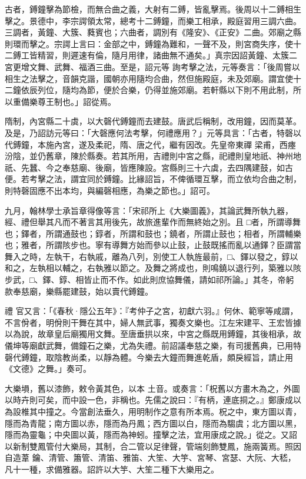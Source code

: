 \begin{pinyinscope}
 古者，鎛鐘擊為節檢，而無合曲之義，大射有二鎛，皆亂擊焉。後周以十二鎛相生擊之。景德中，李宗諤領太常，總考十二鎛鐘，而樂工相承，殿庭習用三調六曲。三調者，黃鐘、大簇、蕤賓也；六曲者，調別有《隆安》、《正安》二曲。郊廟之縣則環而擊之。宗諤上言曰：金部之中，鎛鐘為難和，一聲不及，則宮商失序，使十二鎛工皆精習，則遲速有倫，隨月用律，諸曲無不通矣。」真宗因詔黃鐘、太簇二宮更增文舞、武舞、福酒三曲。至是，詔元等
 詢考擊之法，元等奏言：「後周嘗以相生之法擊之，音韻克諧，國朝亦用隨均合曲，然但施殿庭，未及郊廟。謂宜使十二鐘依辰列位，隨均為節，便於合樂，仍得並施郊廟。若軒縣以下則不用此制，所以重備樂尊王制也。」詔從焉。



 隋制，內宮縣二十虡，以大磬代鎛鐘而去建鼓。唐武后稱制，改用鐘，因而莫革。及是，乃詔訪元等曰：「大磬應何法考擊，何禮應用？」元等具言：「古者，特磬以代鎛鐘，本施內宮，遂及柔祀，隋、唐之代，繼有因改。先皇帝東禪
 梁甫，西瘞汾陰，並仍舊章，陳於縣奏。若其所用，吉禮則中宮之縣，祀禮則皇地祇、神州地祇、先蠶、今之奉慈廟、後廟，皆應陳設。宮縣則三十六虡，去四隅建鼓，如古便。若考擊之法，謂宜同於鎛鐘。比緣詔旨，不俾循環互擊，而立依均合曲之制，則特磬固應不出本均，與編磬相應，為樂之節也。」詔可。



 九月，翰林學士承旨章得像等言：「宋祁所上《大樂圖義》，其論武舞所執九器，經、禮但舉其凡而不著言其用後先，故旅進輩作而無終始之別。且
 □者，所謂導舞也；鐸者，所謂通鼓也；錞者，所謂和鼓也；鐃者，所謂止鼓也；相者，所謂輔樂也；雅者，所謂陔步也。寧有導舞方始而參以止鼓，止鼓既搖而亂以通鐸？臣謂當舞入之時，左執干，右執戚，離為八列，別使工人執旌最前，□、鐸以發之，錞以和之，左執相以輔之，右執雅以節之。及舞之將成也，則鳴鐃以退行列，築雅以陔步武，□、鐸、錞、相皆止而不作。如此則庶協舞儀，請如祁所論。」其冬，帝躬款奉慈廟，樂縣罷建鼓，始以賣代鎛鐘。



 禮
 官又言：「《春秋·隱公五年》：『考仲子之宮，初獻六羽。』何休、範寧等咸謂，不言佾者，明佾則干舞在其中，婦人無武事，獨奏文樂也。江左宋建平、王宏皆據以為說，故章皇后廟獨用文舞。至唐垂拱以來，中宮之縣既用鎛鐘，其後相承，故儀坤等廟獻武舞，備鐘石之樂，尤為失禮。前詔議奉慈之樂，有司援舊典，已用特磬代鎛鐘，取陰教尚柔，以靜為體。今樂去大鐘而舞進乾盾，頗戾經旨，請止用《文德》之舞。」奏可。



 大樂塤，舊以漆飾，敕令黃其色，以本
 土音。或奏言：「柷舊以方畫木為之，外圖以時卉則可矣，而中設一色，非稱也。先儒之說曰：『有柄，連底挏之。』鄭康成以為設椎其中撞之。今當創法垂久，用明制作之意有所本焉。柷之中，東方圖以青，隱而為青龍；南方圖以赤，隱而為丹鳳；西方圖以白，隱而為騶虞；北方圖以黑，隱而為靈龜；中央圖以黃，隱而為神蚓。撞擊之法，宜用康成之說。」從之。又詔以新制雙鳳管付大樂局，其制，合二管以足律聲，管端刻飾雙鳳，施兩簧焉。照因自造葦
 鑰、清管、簫管、清笛、雅笛、大笙、大竽、宮琴、宮瑟、大阮、大嵇，凡十一種，求備雅器。詔許以大竽、大笙二種下大樂用之。




\end{pinyinscope}
